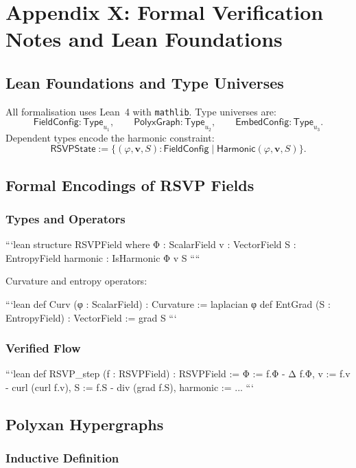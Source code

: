 \chapter*{Appendix X: Formal Verification Notes and Lean Foundations}

\section{Lean Foundations and Type Universes}

All formalisation uses Lean~4 with \texttt{mathlib}.  
Type universes are:
\[
\mathsf{FieldConfig} : \mathsf{Type}_{u_1},\qquad
\mathsf{PolyxGraph} : \mathsf{Type}_{u_2},\qquad
\mathsf{EmbedConfig} : \mathsf{Type}_{u_3}.
\]
Dependent types encode the harmonic constraint:
\[
\mathsf{RSVPState}
  :=
  \{ (\varphi,\mathbf{v},S) : \mathsf{FieldConfig} \mid
     \mathsf{Harmonic}(\varphi,\mathbf{v},S)\}.
\]

\section{Formal Encodings of RSVP Fields}

\subsection{Types and Operators}

```lean
structure RSVPField where
  Φ : ScalarField
  v : VectorField
  S : EntropyField
  harmonic : IsHarmonic Φ v S
````

Curvature and entropy operators:

```lean
def Curv (φ : ScalarField) : Curvature := laplacian φ
def EntGrad (S : EntropyField) : VectorField := grad S
```

\subsection{Verified Flow}

```lean
def RSVP_step (f : RSVPField) : RSVPField :=
  { Φ := f.Φ - Δ f.Φ,
    v := f.v - curl (curl f.v),
    S := f.S - div (grad f.S),
    harmonic := ... }
```

\section{Polyxan Hypergraphs}

\subsection{Inductive Definition}

